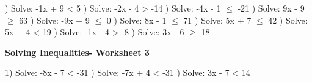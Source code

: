 \documentclass{article}%
\begin{document}
) Solve: -1x + 9 < 5%
\newline%
\newline%
) Solve: -2x - 4 > -14%
\newline%
\newline%
) Solve: -4x - 1 $\leq$ -21%
\newline%
\newline%
) Solve: 9x - 9 $\geq$ 63%
\newline%
\newline%
) Solve: -9x + 9 $\leq$ 0%
\newline%
\newline%
) Solve: 8x - 1 $\leq$ 71%
\newline%
\newline%
) Solve: 5x + 7 $\leq$ 42%
\newline%
\newline%
) Solve: 5x + 4 < 19%
\newline%
\newline%
) Solve: -1x - 4 > -8%
\newline%
\newline%
) Solve: 3x - 6 $\geq$ 18%
\newline%
\newline%
\newline%
\pagebreak%
\large%
\begin{center}%
\textbf{Solving Inequalities- Worksheet 3}%
\newline%
\newline%
\newline%
\end{center} \normalsize%
1) Solve: -8x - 7 < -31%
\newline%
\newline%
) Solve: -7x + 4 < -31%
\newline%
\newline%
) Solve: 3x - 7 < 14%
\newline%
\newline%
\end{document}
